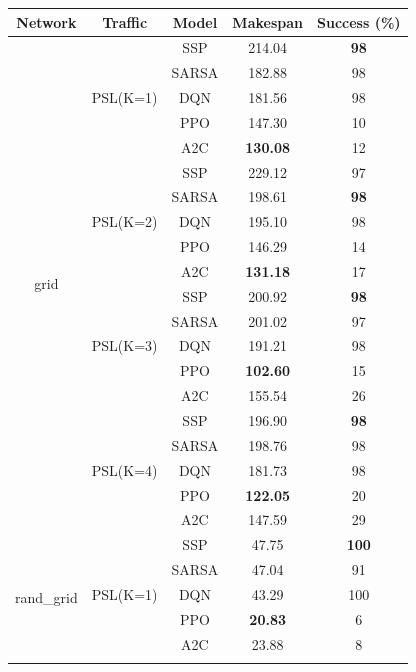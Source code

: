 \begin{table}[]
\centering
\begin{tabular}{|c|c|c|c|c|}
\hline
\textbf{Network} & \textbf{Traffic} & \textbf{Model} & \textbf{Makespan} & \textbf{Success (\%)} \\ \hline
\multirow{20}{*}{grid} & \multirow{5}{*}{PSL(K=1)} & SSP & 214.04 & \textbf{98} \\ \cline{3-5}
 &  & SARSA & 182.88 & 98 \\ \cline{3-5}
 &  & DQN & 181.56 & 98 \\ \cline{3-5}
 &  & PPO & 147.30 & 10 \\ \cline{3-5}
 &  & A2C & \textbf{130.08} & 12 \\ \cline{2-5}
 & \multirow{5}{*}{PSL(K=2)} & SSP & 229.12 & 97 \\ \cline{3-5}
 &  & SARSA & 198.61 & \textbf{98} \\ \cline{3-5}
 &  & DQN & 195.10 & 98 \\ \cline{3-5}
 &  & PPO & 146.29 & 14 \\ \cline{3-5}
 &  & A2C & \textbf{131.18} & 17 \\ \cline{2-5}
 & \multirow{5}{*}{PSL(K=3)} & SSP & 200.92 & \textbf{98} \\ \cline{3-5}
 &  & SARSA & 201.02 & 97 \\ \cline{3-5}
 &  & DQN & 191.21 & 98 \\ \cline{3-5}
 &  & PPO & \textbf{102.60} & 15 \\ \cline{3-5}
 &  & A2C & 155.54 & 26 \\ \cline{2-5}
 & \multirow{5}{*}{PSL(K=4)} & SSP & 196.90 & \textbf{98} \\ \cline{3-5}
 &  & SARSA & 198.76 & 98 \\ \cline{3-5}
 &  & DQN & 181.73 & 98 \\ \cline{3-5}
 &  & PPO & \textbf{122.05} & 20 \\ \cline{3-5}
 &  & A2C & 147.59 & 29 \\ \hline
\multirow{20}{*}{rand\_grid} & \multirow{5}{*}{PSL(K=1)} & SSP & 47.75 & \textbf{100} \\ \cline{3-5}
 &  & SARSA & 47.04 & 91 \\ \cline{3-5}
 &  & DQN & 43.29 & 100 \\ \cline{3-5}
 &  & PPO & \textbf{20.83} & 6 \\ \cline{3-5}
 &  & A2C & 23.88 & 8 \\ \cline{2-5}

\end{tabular}
\end{table}
